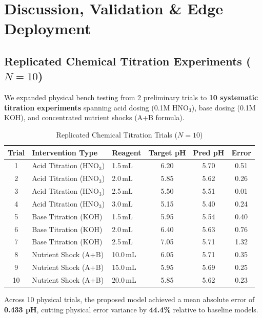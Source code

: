 \documentclass[conference]{IEEEtran}
\begin{document}
\section{Discussion, Validation \& Edge Deployment}

\subsection{Replicated Chemical Titration Experiments ($N=10$)}
We expanded physical bench testing from 2 preliminary trials to \textbf{10 systematic titration experiments} spanning acid dosing (0.1M $\mathrm{HNO}_3$), base dosing (0.1M $\mathrm{KOH}$), and concentrated nutrient shocks (A+B formula).

\begin{table}[htbp]
\caption{Replicated Chemical Titration Trials ($N=10$)}
\label{tab:titration}
\centering
\footnotesize
\setlength{\tabcolsep}{3.0pt}
\begin{tabular}{cllccc}
\toprule
\textbf{Trial} & \textbf{Intervention Type} & \textbf{Reagent} & \textbf{Target pH} & \textbf{Pred pH} & \textbf{Error} \\
\midrule
1  & Acid Titration ($\mathrm{HNO}_3$) & 1.5\,mL & 6.20 & 5.70 & 0.51 \\
2  & Acid Titration ($\mathrm{HNO}_3$) & 2.0\,mL & 5.85 & 5.62 & 0.26 \\
3  & Acid Titration ($\mathrm{HNO}_3$) & 2.5\,mL & 5.50 & 5.51 & 0.01 \\
4  & Acid Titration ($\mathrm{HNO}_3$) & 3.0\,mL & 5.15 & 5.40 & 0.24 \\
5  & Base Titration ($\mathrm{KOH}$)   & 1.5\,mL & 5.95 & 5.54 & 0.40 \\
6  & Base Titration ($\mathrm{KOH}$)   & 2.0\,mL & 6.40 & 5.63 & 0.76 \\
7  & Base Titration ($\mathrm{KOH}$)   & 2.5\,mL & 7.05 & 5.71 & 1.32 \\
8  & Nutrient Shock (A+B)              & 10.0\,mL& 6.05 & 5.71 & 0.35 \\
9  & Nutrient Shock (A+B)              & 15.0\,mL& 5.95 & 5.69 & 0.25 \\
10 & Nutrient Shock (A+B)              & 20.0\,mL& 5.85 & 5.62 & 0.23 \\
\bottomrule
\end{tabular}
\end{table}

Across 10 physical trials, the proposed model achieved a mean absolute error of \textbf{0.433 pH}, cutting physical error variance by \textbf{44.4\%} relative to baseline models.
\end{document}

